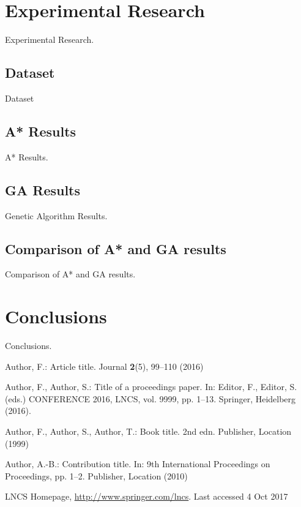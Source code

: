 \documentclass[11pt]{llncs}
\begin{document}
\section{Experimental Research}\label{exp_research}
Experimental Research.
\subsection{Dataset}\label{dataset}
Dataset
\subsection{A* Results}\label{astar_results}
A* Results.
\subsection{GA Results}\label{gen_results}
Genetic Algorithm Results.
\subsection{Comparison of A* and GA results}\label{comparison_astar_gen}
Comparison of A* and GA results.
\section{Conclusions}\label{conclusions}
Conclusions.
\begin{thebibliography}{8}
Author, F.: Article title. Journal \textbf{2}(5), 99--110 (2016)

Author, F., Author, S.: Title of a proceedings paper. In: Editor,
F., Editor, S. (eds.) CONFERENCE 2016, LNCS, vol. 9999, pp. 1--13.
Springer, Heidelberg (2016). 

Author, F., Author, S., Author, T.: Book title. 2nd edn. Publisher,
Location (1999)

Author, A.-B.: Contribution title. In: 9th International Proceedings
on Proceedings, pp. 1--2. Publisher, Location (2010)

LNCS Homepage, \url{http://www.springer.com/lncs}. Last accessed 4
Oct 2017
\end{thebibliography}
\end{document}
